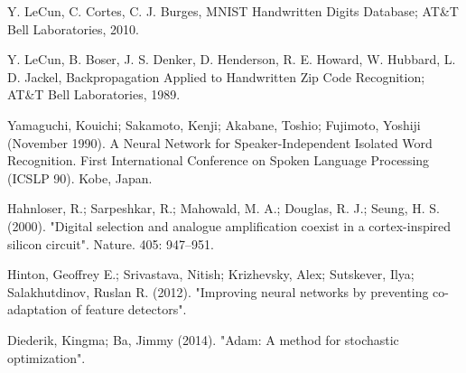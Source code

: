 \documentclass[transmag]{IEEEtran}
\begin{document}
\pagebreak
\begin{thebibliography}{00}

 Y. LeCun, C. Cortes, C. J. Burges, MNIST Handwritten Digits 
    Database; AT\&T Bell Laboratories, 2010.

 Y. LeCun, B. Boser, J. S. Denker, D. Henderson, R. E. Howard, 
    W. Hubbard, L. D. Jackel, Backpropagation Applied to Handwritten Zip Code 
    Recognition; AT\&T Bell Laboratories, 1989.

 Yamaguchi, Kouichi; Sakamoto, Kenji; Akabane, Toshio; Fujimoto, 
    Yoshiji (November 1990). A Neural Network for Speaker-Independent Isolated 
    Word Recognition. First International Conference on Spoken Language 
    Processing (ICSLP 90). Kobe, Japan.

 Hahnloser, R.; Sarpeshkar, R.; Mahowald, M. A.; Douglas, 
    R. J.; Seung, H. S. (2000). "Digital selection and analogue amplification 
    coexist in a cortex-inspired silicon circuit". Nature. 405: 947–951.


 Hinton, Geoffrey E.; Srivastava, Nitish; Krizhevsky, Alex; 
    Sutskever, Ilya; Salakhutdinov, Ruslan R. (2012). "Improving neural 
    networks by preventing co-adaptation of feature detectors".

 Diederik, Kingma; Ba, Jimmy (2014). "Adam: A method for 
    stochastic optimization".

\end{thebibliography}
\end{document}

